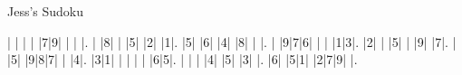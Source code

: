 Jess's Sudoku\vspace{0.2cm}

\begin{sudoku-block}| | | | |7|9| | | |.
| |8| | |5| |2| |1|.
|5| |6| |4| |8| | |.
| |9|7|6| | | |1|3|.
|2| | |5| | |9| |7|.
| |5| |9|8|7| | |4|.
|3|1| | | | | |6|5|.
| | | |4| |5| |3| |.
|6| |5|1| |2|7|9| |.
\end{sudoku-block}